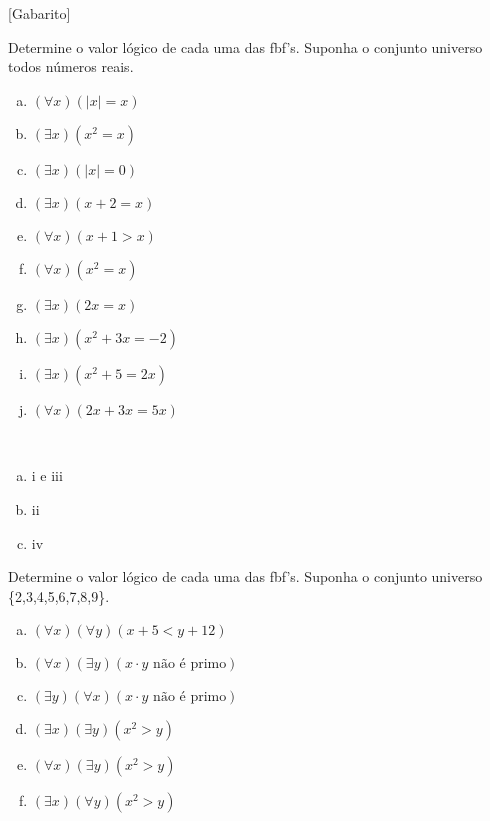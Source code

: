 \documentclass[a4paper, 12pt, addpoints]{exam}
\begin{document}
\info\vspace{-1 cm} %
[Gabarito]
\begin{questions}%
  \question Determine o valor lógico de cada uma das fbf's. Suponha o conjunto universo todos números reais.
  \begin{multicols}{2}
    \begin{enumerate}[a)]
      \item $(\forall x)(|x| = x)$
      \item $(\exists x)(x^2 = x)$
      \item $(\exists x)(|x| = 0)$
      \item $(\exists x)(x + 2 = x)$
      \item $(\forall x)(x + 1 > x)$
      \item $(\forall x)(x^2 = x)$
      \item $(\exists x)(2x = x)$
      \item $(\exists x)(x^2 + 3x = -2)$
      \item $(\exists x)(x^2 + 5 = 2x)$
      \item $(\forall x)(2x + 3x = 5x)$
    \end{enumerate}
\end{multicols}

  \begin{resp}~
    \begin{multicols}{4}
          \begin{enumerate}[a)]
            \item i e iii
            \item ii
            \item iv
          \end{enumerate}
        \end{multicols}
  \end{resp}

  \question  Determine o valor lógico de cada uma das fbf's. Suponha o conjunto universo \{2,3,4,5,6,7,8,9\}.
  \begin{multicols}{2}
    \begin{enumerate}[a)]
      \item $(\forall x)(\forall y)(x + 5 < y + 12)$
      \item $(\forall x)(\exists y)(x \cdot y \text{ não é primo})$
      \item $(\exists y)(\forall x)(x \cdot y \text{ não é primo})$
      \item $(\exists x)(\exists y)(x^2 > y)$
      \item $(\forall x)(\exists y)(x^2 > y)$
      \item $(\exists x)(\forall y)(x^2 > y)$
    \end{enumerate}
  \end{multicols}


\end{questions}
\end{document}
